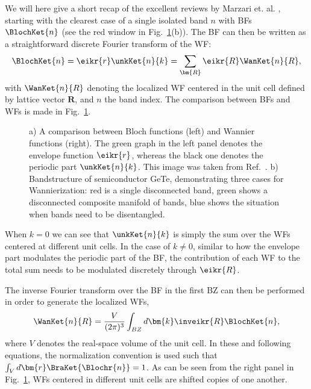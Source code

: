 We will here give a short recap of the excellent reviews by Marzari et. al. \cite{Marzari2003,Marzari2012}, starting with the clearest case of a single isolated band $n$ with \glspl{BF} $\BlochKet{n}$ (see the red window in Fig.~\ref{fig:Theory_blochvswan}(b)).
The \gls{BF} can then be written as a straightforward discrete Fourier transform of the \gls{WF}: 
\begin{equation}
	\label{eq:Theory_1bandwan}
	\BlochKet{n} = \eikr{r} \unkKet{n}{k} = \sum_{\bm{R}} \eikr{R} \WanKet{n}{R},
\end{equation}
with $\WanKet{n}{R}$ denoting the localized \gls{WF} centered in the unit cell defined by lattice vector $\bm{R}$, and $n$ the band index.
The comparison between \glspl{BF} and \glspl{WF} is made in Fig.~\ref{fig:Theory_blochvswan}.
\begin{figure}
	\caption{\label{fig:Theory_blochvswan} a) A comparison between Bloch functions (left) and Wannier functions (right). The green graph in the left panel denotes the envelope function $\eikr{r}$, whereas the black one denotes the periodic part $\unkKet{n}{k}$. This image was taken from Ref.~\cite{Marzari2012}. b) Bandstructure of semiconductor GeTe, demonstrating three cases for Wannierization: red is a single disconnected band, green shows a disconnected composite manifold of bands, blue shows the situation when bands need to be disentangled.}
\end{figure}
When $k=0$ we can see that $\unkKet{n}{k}$ is simply the sum over the \glspl{WF} centered at different unit cells.
In the case of $k \neq 0$, similar to how the envelope part modulates the periodic part of the \gls{BF}, the contribution of each \gls{WF} to the total sum needs to be modulated discretely through $\eikr{R}$.

The inverse Fourier transform over the \gls{BF} in the first \gls{BZ} can then be performed in order to generate the localized \glspl{WF},
\begin{equation}
	\label{eq:Theory_wanfourier}
	\WanKet{n}{R} = \frac{V}{(2\pi)^3} \int_{BZ} d \bm{k} \inveikr{R} \BlochKet{n},
\end{equation}
where $V$ denotes the real-space volume of the unit cell.
In these and following equations, the normalization convention is used such that $\int_V d\bm{r}\BraKet{\Blochr{n}} = 1$.
As can be seen from the right panel in Fig.~\ref{fig:Theory_blochvswan}, \glspl{WF} centered in different unit cells are shifted copies of one another.

